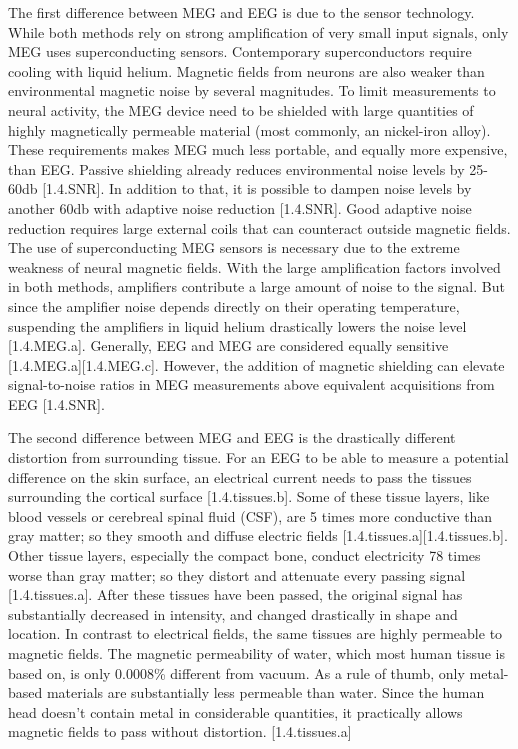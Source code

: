 The first difference between MEG and EEG is due to the sensor technology.
While both methods rely on strong amplification of very small input signals, only MEG uses superconducting sensors.
Contemporary superconductors require cooling with liquid helium.
Magnetic fields from neurons are also weaker than environmental magnetic noise by several magnitudes.
To limit measurements to neural activity, the MEG device need to be shielded with large quantities of highly magnetically permeable material (most commonly, an nickel-iron alloy).
These requirements makes MEG much less portable, and equally more expensive, than EEG.
Passive shielding already reduces environmental noise levels by 25-60db [1.4.SNR].
In addition to that, it is possible to dampen noise levels by another 60db with adaptive noise reduction [1.4.SNR].
Good adaptive noise reduction requires large external coils that can counteract outside magnetic fields.
The use of superconducting MEG sensors is necessary due to the extreme weakness of neural magnetic fields.
With the large amplification factors involved in both methods, amplifiers contribute a large amount of noise to the signal.
But since the amplifier noise depends directly on their operating temperature, suspending the amplifiers in liquid helium drastically lowers the noise level [1.4.MEG.a].
Generally, EEG and MEG are considered equally sensitive [1.4.MEG.a][1.4.MEG.c].
However, the addition of magnetic shielding can elevate signal-to-noise ratios in MEG measurements above equivalent acquisitions from EEG [1.4.SNR].

The second difference between MEG and EEG is the drastically different distortion from surrounding tissue.
For an EEG to be able to measure a potential difference on the skin surface, an electrical current needs to pass the tissues surrounding the cortical surface [1.4.tissues.b].
Some of these tissue layers, like blood vessels or cerebreal spinal fluid (CSF), are 5 times more conductive than gray matter; so they smooth and diffuse electric fields [1.4.tissues.a][1.4.tissues.b].
Other tissue layers, especially the compact bone, conduct electricity 78 times worse than gray matter; so they distort and attenuate every passing signal [1.4.tissues.a].
After these tissues have been passed, the original signal has substantially decreased in intensity, and changed drastically in shape and location.
In contrast to electrical fields, the same tissues are highly permeable to magnetic fields.
The magnetic permeability of water, which most human tissue is based on, is only 0.0008\% different from vacuum.
As a rule of thumb, only metal-based materials are substantially less permeable than water.
Since the human head doesn't contain metal in considerable quantities, it practically allows magnetic fields to pass without distortion. [1.4.tissues.a]

